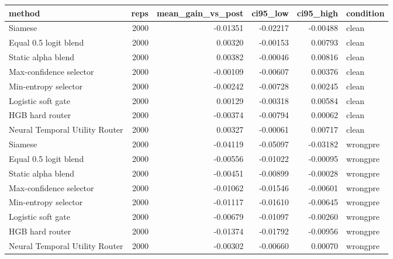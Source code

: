 \begin{tabular}{lrrrrl}
\toprule
method & reps & mean\_gain\_vs\_post & ci95\_low & ci95\_high & condition \\
\midrule
Siamese & 2000 & -0.01351 & -0.02217 & -0.00488 & clean \\
Equal 0.5 logit blend & 2000 & 0.00320 & -0.00153 & 0.00793 & clean \\
Static alpha blend & 2000 & 0.00382 & -0.00046 & 0.00816 & clean \\
Max-confidence selector & 2000 & -0.00109 & -0.00607 & 0.00376 & clean \\
Min-entropy selector & 2000 & -0.00242 & -0.00728 & 0.00245 & clean \\
Logistic soft gate & 2000 & 0.00129 & -0.00318 & 0.00584 & clean \\
HGB hard router & 2000 & -0.00374 & -0.00794 & 0.00062 & clean \\
Neural Temporal Utility Router & 2000 & 0.00327 & -0.00061 & 0.00717 & clean \\
Siamese & 2000 & -0.04119 & -0.05097 & -0.03182 & wrongpre \\
Equal 0.5 logit blend & 2000 & -0.00556 & -0.01022 & -0.00095 & wrongpre \\
Static alpha blend & 2000 & -0.00451 & -0.00899 & -0.00028 & wrongpre \\
Max-confidence selector & 2000 & -0.01062 & -0.01546 & -0.00601 & wrongpre \\
Min-entropy selector & 2000 & -0.01117 & -0.01610 & -0.00645 & wrongpre \\
Logistic soft gate & 2000 & -0.00679 & -0.01097 & -0.00260 & wrongpre \\
HGB hard router & 2000 & -0.01374 & -0.01792 & -0.00956 & wrongpre \\
Neural Temporal Utility Router & 2000 & -0.00302 & -0.00660 & 0.00070 & wrongpre \\
\bottomrule
\end{tabular}
